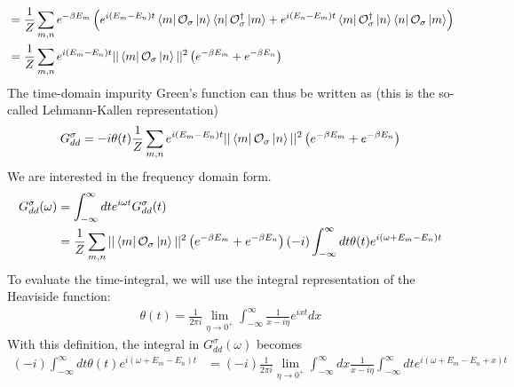 \documentclass[reprint,hidelinks]{revtex4-2}
\begin{document}
\begin{widetext}
\begin{equation}
\begin{aligned}
	&= \frac{1}{Z}\sum_{m,n}e^{-\beta E_m}\left( e^{i\left( E_m - E_n \right)  t}\bra{m}\mathcal{O}_{\sigma}\ket{n}\bra{n}\mathcal{O}^\dagger_{\sigma} \ket{m} + e^{i\left( E_n - E_m \right)  t}\bra{m}\mathcal{O}^\dagger_{\sigma}\ket{n}\bra{n}\mathcal{O}_{\sigma} \ket{m}\right)\\
	&= \frac{1}{Z}\sum_{m,n}e^{i\left( E_m - E_n \right)  t}||\bra{m}\mathcal{O}_{\sigma}\ket{n}||^2\left( e^{-\beta E_m} + e^{-\beta E_n}\right)\\
\end{aligned}\end{equation}
The time-domain impurity Green's function can thus be written as (this is the so-called Lehmann-Kallen representation)
\begin{equation}\begin{aligned}
	G_{dd}^\sigma = -i\theta(t)\frac{1}{Z}\sum_{m,n}e^{i\left( E_m - E_n \right)  t}||\bra{m}\mathcal{O}_{\sigma}\ket{n}||^2\left( e^{-\beta E_m} + e^{-\beta E_n}\right)\\
\end{aligned}\end{equation}
We are interested in the frequency domain form.
\begin{equation}\begin{aligned}
	G_{d d}^\sigma(\omega) &= \int_{-\infty}^\infty dt e^{i \omega t}G_{d d}^\sigma(t) \\
			       &= \frac{1}{Z}\sum_{m,n}||\bra{m}\mathcal{O}_{\sigma}\ket{n}||^2\left( e^{-\beta E_m} + e^{-\beta E_n}\right)\left(-i\right)\int_{-\infty}^\infty dt \theta(t)e^{i\left( \omega + E_m - E_n \right)t}
\end{aligned}\end{equation}
To evaluate the time-integral, we will use the integral representation of the Heaviside function:
\begin{equation}\begin{aligned}
	\theta(t) = \frac{1}{2\pi i}\lim_{\eta \to 0^+} \int_{-\infty}^\infty \frac{1}{x- i\eta}e^{ixt}dx
\end{aligned}\end{equation}
With this definition, the integral in \(G_{dd}^\sigma(\omega)\) becomes
\begin{equation}\begin{aligned}
	\left(-i\right)\int_{-\infty}^\infty dt \theta(t)e^{i\left( \omega + E_m - E_n \right)t} &= \left(-i\right)\frac{1}{2\pi i}\lim_{\eta \to 0^+} \int_{-\infty}^\infty dx\frac{1}{x- i\eta}\int_{-\infty}^\infty dt e^{i\left( \omega + E_m - E_n + x\right)t} \\

\end{aligned}
\end{equation}
\end{widetext}
\end{document}
